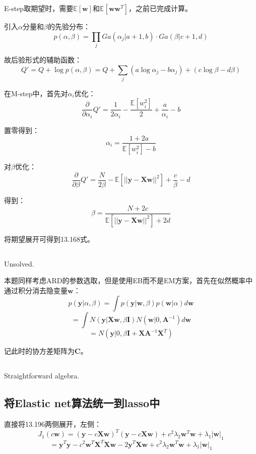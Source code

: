 \documentclass[UTF8]{ctexart}
\begin{document}
E-step取期望时，需要$\mathbb{E}[\textbf{w}]$和$\mathbb{E}[\textbf{w}\textbf{w}^{T}]$，之前已完成计算。

引入$\alpha$分量和$\beta$的先验分布：
$$p(\alpha,\beta)=\prod_{j}Ga(\alpha_{j}|a+1,b) \cdot Ga(\beta|c+1,d)$$

故后验形式的辅助函数：
$$Q'=Q + \log p(\alpha,\beta) = Q + \sum_{j}(a \log \alpha_{j}-b \alpha_{j}) + (c \log \beta - d \beta)$$

在M-step中，首先对$\alpha_{i}$优化：
$$\frac{\partial}{\partial \alpha_{i}} Q'=\frac{1}{2\alpha_{i}}-\frac{\mathbb{E}[w_{i}^{2}]}{2} + \frac{a}{\alpha_{i}} -b$$

置零得到：
$$\alpha_{i}=\frac{1+2a}{\mathbb{E}[w_{i}^{2}]-b}$$

对$\beta$优化：
$$\frac{\partial}{\partial \beta}Q'=\frac{N}{2\beta}-\mathbb{E}[||\textbf{y}-\textbf{X}\textbf{w}||^{2}]+\frac{c}{\beta}-d$$

得到：
$$\beta = \frac{N+2c}{\mathbb{E}[||\textbf{y}-\textbf{X}\textbf{w}||^{2}]+2d}$$

将期望展开可得到13.168式。

\subsection{}
Unsolved.

本题同样考虑ARD的参数选取，但是使用EB而不是EM方案，首先在似然概率中通过积分消去隐变量$\textbf{w}$：
$$p(\textbf{y}|\alpha,\beta)=\int p(\textbf{y}|\textbf{w},\beta)p(\textbf{w}|\alpha)d\textbf{w}$$
$$=\int N(\textbf{y}|\textbf{X}\textbf{w},\beta \textbf{I})N(\textbf{w}|0,\textbf{A}^{-1})d\textbf{w}$$
$$=N(\textbf{y}|0,\beta \textbf{I} + \textbf{X}\textbf{A}^{-1}\textbf{X}^{T})$$

记此时的协方差矩阵为$\textbf{C}$。

\subsection{}
Straightforward algebra.

\subsection{将Elastic net算法统一到lasso中}
直接将13.196两侧展开，左侧：
$$J_{1}(c\textbf{w})=(\textbf{y}-c\textbf{X}\textbf{w})^{T}(\textbf{y}-c\textbf{X}\textbf{w}) + c^{2}\lambda_{2}\textbf{w}^{T}\textbf{w} + \lambda_{1}|\textbf{w}|_{1}$$
$$=\textbf{y}^{T}\textbf{y} - c^{2}\textbf{w}^{T}\textbf{X}^{T}\textbf{X}\textbf{w} - 2 \textbf{y}^{T}\textbf{X}\textbf{w} + c^{2}\lambda_{2}\textbf{w}^{T}\textbf{w} + \lambda_{1}|\textbf{w}|_{1}$$
\end{document}
